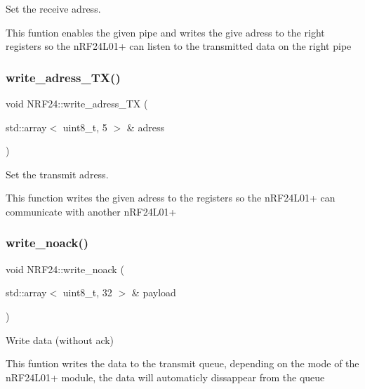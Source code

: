 Set the receive adress. 

This funtion enables the given pipe and writes the give adress to the right registers so the n\+R\+F24\+L01+ can listen to the transmitted data on the right pipe \mbox{\label{classNRF24_aa6bf7e16ef36684275d7e2ff0a8d4d98}} 
\subsubsection{\texorpdfstring{write\+\_\+adress\+\_\+\+T\+X()}{write\_adress\_TX()}}
{\footnotesize\ttfamily void N\+R\+F24\+::write\+\_\+adress\+\_\+\+TX (\begin{DoxyParamCaption}\item[{std\+::array$<$ uint8\+\_\+t, 5 $>$ \&}]{adress }\end{DoxyParamCaption})}



Set the transmit adress. 

This function writes the given adress to the registers so the n\+R\+F24\+L01+ can communicate with another n\+R\+F24\+L01+ \mbox{\label{classNRF24_a83fa4502e17465aaf55fc65c80d30f8c}} 
\subsubsection{\texorpdfstring{write\+\_\+noack()}{write\_noack()}}
{\footnotesize\ttfamily void N\+R\+F24\+::write\+\_\+noack (\begin{DoxyParamCaption}\item[{std\+::array$<$ uint8\+\_\+t, 32 $>$ \&}]{payload }\end{DoxyParamCaption})}



Write data (without ack) 

This funtion writes the data to the transmit queue, depending on the mode of the n\+R\+F24\+L01+ module, the data will automaticly dissappear from the queue \mbox{\label{classNRF24_a30f43278c0048409e32fb21fff5f448b}} 
